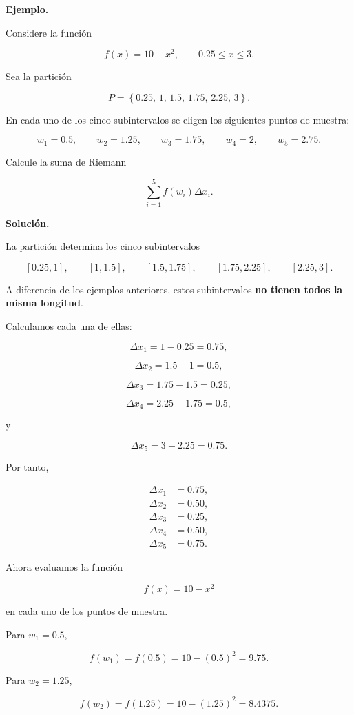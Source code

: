 \documentclass[12pt]{article}
\newenvironment{Ejem}
{\par\medskip\noindent\textbf{Ejemplo.}\ }
{\par\medskip}
\begin{document}
\begin{Ejem}

Considere la función

\[
f(x)=10-x^2,
\qquad
0.25\leq x\leq 3.
\]

Sea la partición

\[
P=
\left\{
0.25,\,
1,\,
1.5,\,
1.75,\,
2.25,\,
3
\right\}.
\]

En cada uno de los cinco subintervalos se eligen los siguientes
puntos de muestra:

\[
w_1=0.5,
\qquad
w_2=1.25,
\qquad
w_3=1.75,
\qquad
w_4=2,
\qquad
w_5=2.75.
\]

Calcule la suma de Riemann

\[
\sum_{i=1}^{5}f(w_i)\Delta x_i.
\]

\textbf{Solución.}

La partición determina los cinco subintervalos

\[
[0.25,1],
\qquad
[1,1.5],
\qquad
[1.5,1.75],
\qquad
[1.75,2.25],
\qquad
[2.25,3].
\]

A diferencia de los ejemplos anteriores, estos subintervalos
\textbf{no tienen todos la misma longitud}.

Calculamos cada una de ellas:

\[
\Delta x_1
=
1-0.25
=
0.75,
\]

\[
\Delta x_2
=
1.5-1
=
0.5,
\]

\[
\Delta x_3
=
1.75-1.5
=
0.25,
\]

\[
\Delta x_4
=
2.25-1.75
=
0.5,
\]

y

\[
\Delta x_5
=
3-2.25
=
0.75.
\]

Por tanto,

\[
\begin{aligned}
\Delta x_1&=0.75,\\
\Delta x_2&=0.50,\\
\Delta x_3&=0.25,\\
\Delta x_4&=0.50,\\
\Delta x_5&=0.75.
\end{aligned}
\]

Ahora evaluamos la función

\[
f(x)=10-x^2
\]

en cada uno de los puntos de muestra.

Para $w_1=0.5$,

\[
f(w_1)
=
f(0.5)
=
10-(0.5)^2
=
9.75.
\]

Para $w_2=1.25$,

\[
f(w_2)
=
f(1.25)
=
10-(1.25)^2
=
8.4375.
\]


\end{Ejem}
\end{document}
